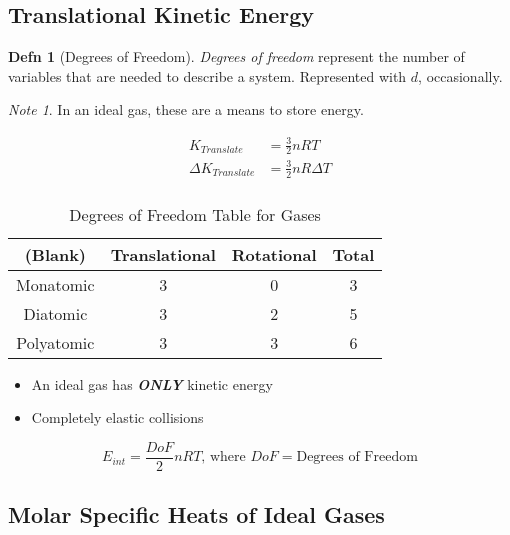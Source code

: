 \documentclass[10pt,letterpaper,final,twoside,notitlepage]{article}
\numberwithin{equation}{section} %
\theoremstyle{definition}
\newtheorem{definition}{Defn} %
\theoremstyle{remark}
\newtheorem{note}{Note}[definition] %
\begin{document}
	\subsection*{Translational Kinetic Energy} \label{subsec:Translational Kinetic Energy}
		\begin{definition}[Degrees of Freedom] \label{def:Degrees of Freedom}
			\emph{Degrees of freedom} represent the number of variables that are needed to describe a system. Represented with $d$, occasionally.
			\begin{note}
				In an ideal gas, these are a means to store energy.
			\end{note}
		\end{definition}
		\begin{equation} \label{eq:Translational Kinetic Energy}
			\begin{aligned}
				K_{Translate} &= \frac{3}{2}nRT \\
				\Delta K_{Translate} &= \frac{3}{2}nR \Delta T \\
			\end{aligned}
		\end{equation}
		\begin{table}[h!]
			\centering
			\begin{tabular}{c|c|c|c}
				(Blank) & Translational & Rotational & Total \\ \hline
				Monatomic & 3 & 0 & 3 \\ \hline
				Diatomic & 3 & 2 & 5 \\ \hline
				Polyatomic & 3 & 3 & 6 \\
			\end{tabular}
			\caption{Degrees of Freedom Table for Gases}
			\label{tab:Degrees of Freedom}
		\end{table}
		\begin{itemize}[noitemsep, nolistsep]
			\item An ideal gas has \emph{\textbf{ONLY}} kinetic energy
			\item Completely elastic collisions
		\end{itemize}
		
		\begin{equation} \label{eq:Internal Energy of Ideal Gas}
			E_{int} = \frac{DoF}{2} nRT \text{, where } DoF=\text{Degrees of Freedom}
		\end{equation}
		
	\subsection*{Molar Specific Heats of Ideal Gases} \label{subsec:Molar Specific Heats of Ideal Gases}
\end{document}
